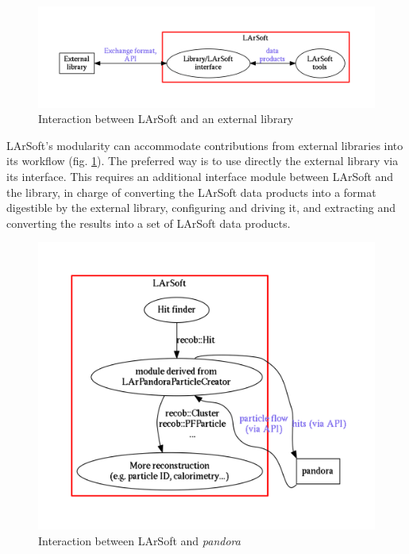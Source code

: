 \begin{figure}[htbp]
\centering
\includegraphics[width=\textwidth]{figures/LArSoftAndExternals.pdf}
\caption{\label{fig:LArSoftAndExternals}Interaction between LArSoft and
an external library}
\end{figure}

LArSoft's modularity can accommodate contributions from external
libraries into its workflow (fig. \ref{fig:LArSoftAndExternals}). The
preferred way is to use directly the external library via its interface.
This requires an additional interface module between LArSoft and the
library, in charge of converting the LArSoft data products into a format
digestible by the external library, configuring and driving it, and
extracting and converting the results into a set of LArSoft data
products.

\begin{figure}[htbp]
\centering
\includegraphics[width=\textwidth]{figures/LArSoftAndPandora.pdf}
\caption{\label{fig:LArSoftAndPandora}Interaction between LArSoft and
\emph{pandora}}
\end{figure}

